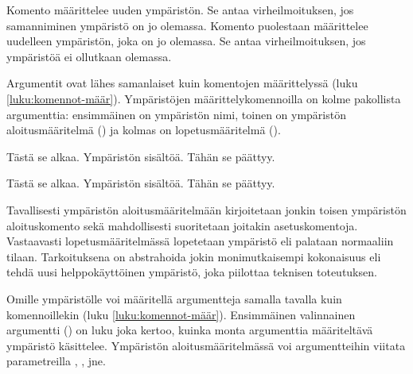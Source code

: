 \begin{koodilohkosis}
  \newenvironment   {nimi}[n][oletus]{aloitus}{lopetus}
  \renewenvironment {nimi}[n][oletus]{aloitus}{lopetus}
\end{koodilohkosis}

Komento  määrittelee uuden ympäristön. Se
antaa virheilmoituksen, jos samanniminen ympäristö on jo olemassa.
Komento  puolestaan määrittelee uudelleen
ympäristön, joka on jo olemassa. Se antaa virheilmoituksen, jos
ympäristöä ei ollutkaan olemassa.

Argumentit ovat lähes samanlaiset kuin komentojen määrittelyssä (luku
\ref{luku:komennot-määr}). Ympäristöjen määrittelykomennoilla on kolme
pakollista argumenttia: ensimmäinen on ympäristön nimi, toinen on
ympäristön aloitusmääritelmä () ja kolmas on
lopetusmääritelmä ().

\pagebreak[3]

\begin{koodilohkosis}
  \newenvironment{ymp}{Tästä se alkaa.}{Tähän se päättyy.}

  \begin{ymp}
    Ympäristön sisältöä.
  \end{ymp}
\end{koodilohkosis}

\begin{tulossis}
  Tästä se alkaa. Ympäristön sisältöä. Tähän se päättyy.
\end{tulossis}

Tavallisesti ympäristön aloitusmääritelmään kirjoitetaan jonkin toisen
ympäristön aloituskomento sekä mahdollisesti suoritetaan joitakin
asetuskomentoja. Vastaavasti lopetusmääritelmässä lopetetaan ympäristö
eli palataan normaaliin tilaan. Tarkoituksena on abstrahoida jokin
monimutkaisempi kokonaisuus eli tehdä uusi helppokäyttöinen ympäristö, joka
piilottaa teknisen toteutuksen.

\begin{koodilohkosis}
  \newenvironment{ymp}
  {\begin{mahtavuus}
      \omia\hienoja\asetuksia}
    {\end{mahtavuus}}
\end{koodilohkosis}

Omille ympäristölle voi määritellä argumentteja samalla tavalla kuin
komennoillekin (luku \ref{luku:komennot-määr}). Ensimmäinen valinnainen
argumentti () on luku joka kertoo, kuinka monta argumenttia
määriteltävä ympäristö käsittelee. Ympäristön aloitusmääritelmässä voi
argumentteihin viitata parametreilla , ,
 jne.

